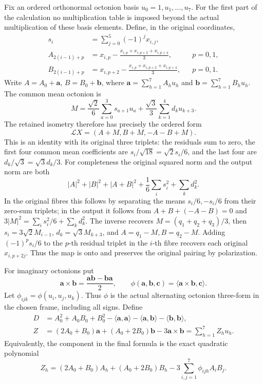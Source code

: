 Fix an ordered orthonormal octonion basis \(u_0=1,u_1,\ldots,u_7\).
For the first part of the calculation no multiplication table is
imposed beyond the actual multiplication of these basis elements.
Define, in the original coordinates,
\begin{align}
 s_i&=\sum_{j=0}^5(-1)^jx_{i,j},\label{nca:eq:original-s}\\
 A_{2(i-1)+p}
  &=x_{i,p}-\frac{x_{i,p}+x_{i,p+2}+x_{i,p+4}}3,
       &&p=0,1,\label{nca:eq:original-A}\\
 B_{2(i-1)+p}
  &=x_{i,p+2}-\frac{x_{i,p}+x_{i,p+2}+x_{i,p+4}}3,
       &&p=0,1.\label{nca:eq:original-B}
\end{align}
Write \(A=A_0+\mathbf a\), \(B=B_0+\mathbf b\), where
\(\mathbf a=\sum_{h=1}^7A_hu_h\) and
\(\mathbf b=\sum_{h=1}^7B_hu_h\).  The common mean octonion is
\begin{equation}
 M=\frac{\sqrt2}{6}\sum_{a=0}^3s_{a+1}u_a
       +\frac{\sqrt3}{3}\sum_{k=1}^4d_ku_{k+3}.
 \label{nca:eq:mean}
\end{equation}
The retained isometry therefore has precisely the ordered form
\[
 \mathcal LX=(A+M,B+M,-A-B+M).
\]
This is an identity with its original three triplets: the residuals
sum to zero, the first four common mean coefficients are
\(s_i/\sqrt{18}=\sqrt2s_i/6\), and the last four are
\(d_k/\sqrt3=\sqrt3d_k/3\).
For completeness the original squared norm and the output norm are both
\[
 |A|^2+|B|^2+|A+B|^2+\frac16\sum_i s_i^2+\sum_kd_k^2.
\]
In the original fibres this follows by separating the means
\(s_i/6,-s_i/6\) from their zero-sum triplets; in the output it
follows from \(A+B+(-A-B)=0\) and
\(3|M|^2=\sum_i s_i^2/6+\sum_kd_k^2\). The inverse recovers
\(M=(q_1+q_2+q_3)/3\), then \(s_i=3\sqrt2M_{i-1}\),
\(d_k=\sqrt3M_{k+3}\), and \(A=q_1-M,B=q_2-M\).
Adding \((-1)^ps_i/6\) to the \(p\)-th residual triplet in the
\(i\)-th fibre recovers each original \(x_{i,p+2j}\). Thus the
map is onto and preserves the original pairing by polarization.

For imaginary octonions put
\[
 \mathbf a\times\mathbf b=\frac{\mathbf a\mathbf b-
                                    \mathbf b\mathbf a}{2},\qquad
 \phi(\mathbf a,\mathbf b,\mathbf c)
                     =\langle\mathbf a\times\mathbf b,\mathbf c\rangle.
\]
Let \(\phi_{ijk}=\phi(u_i,u_j,u_k)\).  Thus \(\phi\) is the
actual alternating octonion three-form in the chosen frame, including
all signs. Define
\begin{align}
 D&=A_0^2+A_0B_0+B_0^2-\langle\mathbf a,\mathbf a\rangle
             -\langle\mathbf a,\mathbf b\rangle
             -\langle\mathbf b,\mathbf b\rangle,\label{nca:eq:D}\\
 Z&=(2A_0+B_0)\mathbf a+(A_0+2B_0)\mathbf b
                               -3\mathbf a\times\mathbf b
       =\sum_{h=1}^7Z_hu_h.\label{nca:eq:Z}
\end{align}
Equivalently, the component in the final formula is the exact
quadratic polynomial
\[
 Z_h=(2A_0+B_0)A_h+(A_0+2B_0)B_h
                  -3\sum_{i,j=1}^7\phi_{ijh}A_iB_j.
\]

